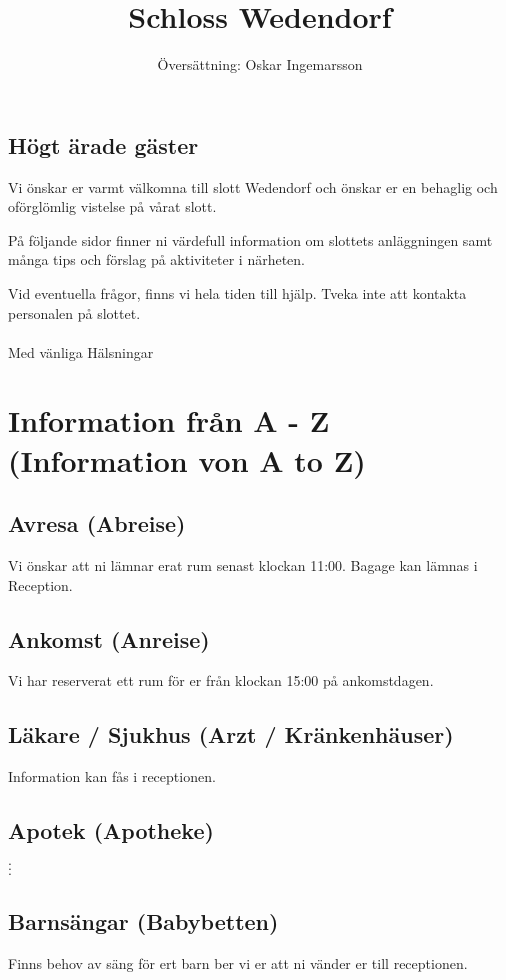 \documentclass{report}
\title{Schloss Wedendorf}
\author{Översättning: Oskar Ingemarsson}
\begin{document}
\maketitle

\section*{Högt ärade gäster}
Vi önskar er varmt välkomna till slott Wedendorf och önskar er en behaglig och oförglömlig vistelse på
vårat slott.

På följande sidor finner ni värdefull information om slottets anläggningen samt många tips och förslag
på aktiviteter i närheten.

Vid eventuella frågor, finns vi hela tiden till hjälp. Tveka inte att kontakta personalen på slottet.
\\\\
Med vänliga Hälsningar

\newpage

\tableofcontents

\newpage

\chapter{Information från A - Z (Information von A to Z)}
\section{Avresa (Abreise)}
Vi önskar att ni lämnar erat rum senast klockan 11:00. Bagage kan lämnas i Reception.
\section{Ankomst (Anreise)}
Vi har reserverat ett rum för er från klockan 15:00 på ankomstdagen.
\section{Läkare / Sjukhus (Arzt / Kränkenhäuser)}
Information kan fås i receptionen.

\section{Apotek (Apotheke)}
$\cdot$ \\
$\cdot$ \\
$\cdot$

\section{Barnsängar (Babybetten)}
Finns behov av säng för ert barn ber vi er att ni vänder er till receptionen.
\end{document}
